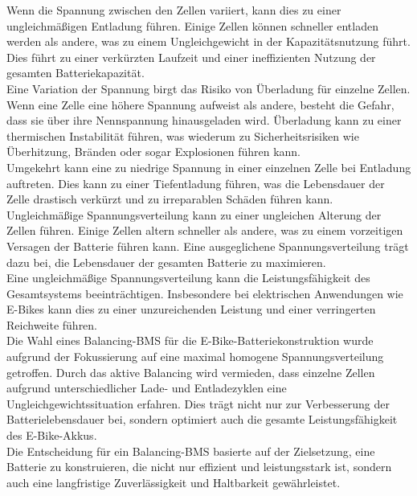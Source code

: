 Wenn die Spannung zwischen den Zellen variiert, kann dies zu einer ungleichmäßigen Entladung führen. Einige Zellen können schneller entladen werden als andere, was zu einem Ungleichgewicht in der Kapazitätsnutzung führt. Dies führt zu einer verkürzten Laufzeit und einer ineffizienten Nutzung der gesamten Batteriekapazität.\\

Eine Variation der Spannung birgt das Risiko von Überladung für einzelne Zellen. Wenn eine Zelle eine höhere Spannung aufweist als andere, besteht die Gefahr, dass sie über ihre Nennspannung hinausgeladen wird. Überladung kann zu einer thermischen Instabilität führen, was wiederum zu Sicherheitsrisiken wie Überhitzung, Bränden oder sogar Explosionen führen kann.\\

Umgekehrt kann eine zu niedrige Spannung in einer einzelnen Zelle bei Entladung auftreten. Dies kann zu einer Tiefentladung führen, was die Lebensdauer der Zelle drastisch verkürzt und zu irreparablen Schäden führen kann.\\

Ungleichmäßige Spannungsverteilung kann zu einer ungleichen Alterung der Zellen führen. Einige Zellen altern schneller als andere, was zu einem vorzeitigen Versagen der Batterie führen kann. Eine ausgeglichene Spannungsverteilung trägt dazu bei, die Lebensdauer der gesamten Batterie zu maximieren.\\

Eine ungleichmäßige Spannungsverteilung kann die Leistungsfähigkeit des Gesamtsystems beeinträchtigen. Insbesondere bei elektrischen Anwendungen wie E-Bikes kann dies zu einer unzureichenden Leistung und einer verringerten Reichweite führen.\\
Die Wahl eines Balancing-BMS für die E-Bike-Batteriekonstruktion wurde aufgrund der Fokussierung auf eine maximal homogene Spannungsverteilung getroffen. Durch das aktive Balancing wird vermieden, dass einzelne Zellen aufgrund unterschiedlicher Lade- und Entladezyklen eine Ungleichgewichtssituation erfahren. Dies trägt nicht nur zur Verbesserung der Batterielebensdauer bei, sondern optimiert auch die gesamte Leistungsfähigkeit des E-Bike-Akkus.\\

Die Entscheidung für ein Balancing-BMS basierte auf der Zielsetzung, eine Batterie zu konstruieren, die nicht nur effizient und leistungsstark ist, sondern auch eine langfristige Zuverlässigkeit und Haltbarkeit gewährleistet.\\


